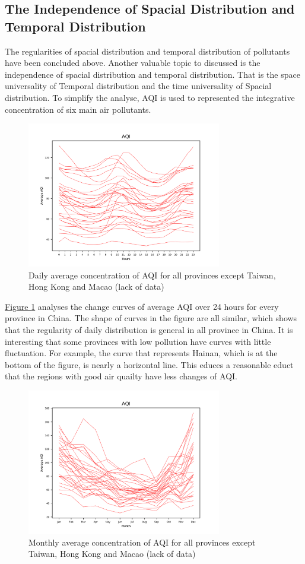 \documentclass[letterpaper]{article}
\begin{document}
\begin{CJK*}{UTF8}{gkai}
\section{The Independence of Spacial Distribution and Temporal Distribution}

The regularities of spacial distribution and temporal distribution of pollutants have been concluded above. Another valuable topic to discussed is the independence of spacial distribution and temporal distribution. That is the space universality of Temporal distribution and the time universality of Spacial distribution. To simplify the analyse, AQI is used to represented the integrative concentration of six main air pollutants.

\begin{figure}[h]
  \includegraphics[width = 8.5cm]{dailyavg_pro_pltn.png}
  \caption{Daily average concentration of AQI for all provinces except Taiwan, Hong Kong and Macao (lack of data)}
  \label{figure:5}
\end{figure}

\hyperref[figure:5]{Figure \ref*{figure:5}} analyses the change curves of average AQI over 24 hours for every province in China. The shape of curves in the figure are all similar, which shows that the regularity of daily distribution is general in all province in China. It is interesting that some provinces with low pollution have curves with little fluctuation. For example, the curve that represents Hainan, which is at the bottom of the figure, is nearly a horizontal line. This educes a reasonable educt that the regions with good air quailty have less changes of AQI.

\begin{figure}[h]
  \includegraphics[width = 8.5cm]{monavg_pro_pltn.png}
  \caption{Monthly average concentration of AQI for all provinces except Taiwan, Hong Kong and Macao (lack of data)}
  \label{figure:6}
\end{figure}


\end{CJK*}
\end{document}
